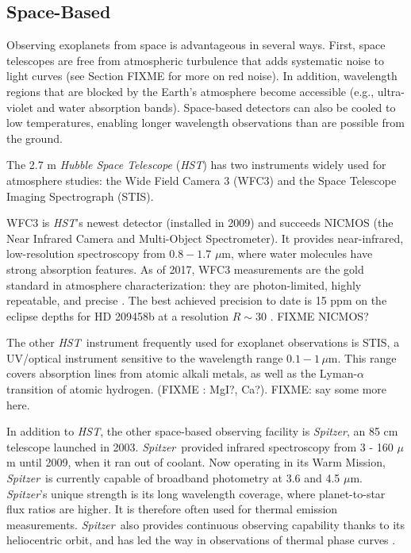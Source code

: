 \documentclass[graybox,natbib,nosecnum]{svmult}
\newcommand{\project}[1]{\textsl{#1}}
\newcommand{\HST}{\project{HST}}
\newcommand{\Spitzer}{\project{Spitzer}}
\begin{document}
\subsection{Space-Based}
Observing exoplanets from space is advantageous in several ways. First, space telescopes are free from atmospheric turbulence that adds systematic noise to light curves (see Section FIXME for more on red noise). In addition, wavelength regions that are blocked by the Earth's atmosphere become accessible (e.g., ultra-violet and water absorption bands).  Space-based detectors can also be cooled to low temperatures, enabling longer wavelength observations than are possible from the ground.

The 2.7 m \emph{Hubble Space Telescope} (\HST) has two instruments widely used for atmosphere studies: the Wide Field Camera 3 (WFC3) and the Space Telescope Imaging Spectrograph (STIS). 

WFC3 is \HST's newest detector (installed in 2009) and succeeds NICMOS (the Near Infrared Camera and Multi-Object Spectrometer). It provides near-infrared, low-resolution spectroscopy from $0.8 - 1.7$ $\mu$m, where water molecules have strong absorption features.  As of 2017, WFC3 measurements are the gold standard in atmosphere characterization: they are photon-limited, highly repeatable, and precise \citep[e.g.][]{deming13, kreidberg14a}. The best achieved precision to date is 15 ppm on the eclipse depths for HD 209458b at a resolution $R\sim 30$ \citep{line16}. FIXME NICMOS?

The other \HST\ instrument frequently used for exoplanet observations is STIS, a UV/optical instrument sensitive to the wavelength range $0.1 - 1 \, \mu$m. This range covers absorption lines from atomic alkali metals, as well as the Lyman-$\alpha$ transition of atomic hydrogen. (FIXME : MgI?, Ca?). FIXME: say some more here.

In addition to \HST, the other space-based observing facility is \Spitzer, an 85 cm telescope launched in 2003. \Spitzer\ provided infrared spectroscopy from 3 - 160 $\mu$m until 2009, when it ran out of coolant. Now operating in its Warm Mission, \Spitzer\ is currently capable of broadband photometry at 3.6 and 4.5 $\mu$m.  \Spitzer's unique strength is its long wavelength coverage, where planet-to-star flux ratios are higher. It is therefore often used for thermal emission measurements. \Spitzer\ also provides continuous observing capability thanks to its heliocentric orbit, and has led the way in observations of thermal phase curves \citep[e.g.][]{knutson07}. 
\end{document}
